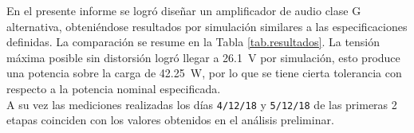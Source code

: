 




	En el presente informe se logró diseñar un amplificador de audio clase G alternativa, obteniéndose resultados por simulación similares a las especificaciones definidas. La comparación se resume en la Tabla \ref{tab.resultados}. La tensión máxima posible sin distorsión logró llegar a \SI{26.1}{\volt} por simulación, esto produce una potencia sobre la carga de \SI{42.25}{\watt}, por lo que se tiene cierta tolerancia con respecto a la potencia nominal especificada.\\
	\indent A su vez las mediciones realizadas los días \texttt{4/12/18} y \texttt{5/12/18} de las primeras 2 etapas coinciden con los valores obtenidos en el análisis preliminar.




